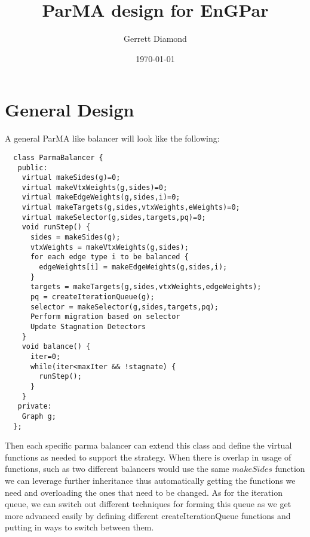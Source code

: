 \documentclass[a4paper]{article}
\title{ParMA design for EnGPar}
\author{Gerrett Diamond}
\date{\today}
\begin{document}
\maketitle
{}



\section{General Design}
A general ParMA like balancer will look like the following:

\begin{lstlisting}
  class ParmaBalancer {
   public:
    virtual makeSides(g)=0;
    virtual makeVtxWeights(g,sides)=0;
    virtual makeEdgeWeights(g,sides,i)=0;
    virtual makeTargets(g,sides,vtxWeights,eWeights)=0;
    virtual makeSelector(g,sides,targets,pq)=0;
    void runStep() {
      sides = makeSides(g);
      vtxWeights = makeVtxWeights(g,sides);
      for each edge type i to be balanced {
        edgeWeights[i] = makeEdgeWeights(g,sides,i);
      }
      targets = makeTargets(g,sides,vtxWeights,edgeWeights);
      pq = createIterationQueue(g);
      selector = makeSelector(g,sides,targets,pq);
      Perform migration based on selector
      Update Stagnation Detectors
    }
    void balance() {
      iter=0;
      while(iter<maxIter && !stagnate) {
        runStep();
      }
    }
   private:
    Graph g;
  };
\end{lstlisting}
Then each specific parma balancer can extend this class and define the virtual functions as needed to support the strategy. When there is overlap in usage of functions, such as two different balancers would use the same $makeSides$ function we can leverage further inheritance thus automatically getting the functions we need and overloading the ones that need to be changed. As for the iteration queue, we can switch out different techniques for forming this queue as we get more advanced easily by defining different createIterationQueue functions and putting in ways to switch between them.
\end{document}
